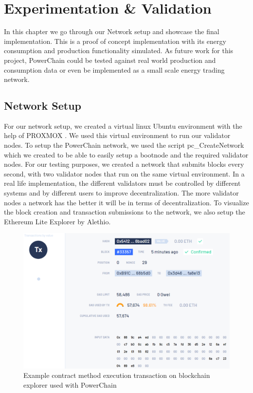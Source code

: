 \chapter{Experimentation \& Validation} \label{experimentationANDresults}
In this chapter we go through our Network setup and showcase the final implementation. This is a proof of concept implementation with its energy consumption and production functionality simulated.
As future work for this project, PowerChain could be tested against real world production and consumption data or even be implemented as a small scale energy trading network.

\section{Network Setup}
For our network setup, we created a virtual linux Ubuntu environment with the help of PROXMOX \cite{proxmox}.
We used this virtual environment to run our validator nodes. To setup the PowerChain network, we used the script pc\_CreateNetwork which we
created to be able to easily setup a bootnode and the required validator nodes. For our testing purposes, we created a network that submits blocks every second, with two validator nodes that
run on the same virtual environment. In a real life implementation, the different validators must be controlled by different systems and by different users to improve
decentralization. The more validator nodes a network has the better it will be in terms of decentralization. To visualize the block creation and transaction submissions 
to the network, we also setup the Ethereum Lite Explorer by Alethio.\cite{alethio} \\
\begin{figure}[h!]
    \centering
    \includegraphics[width=\linewidth,frame,scale=0.9]{Figures/explorer.png}
    \caption{Example contract method execution transaction on blockchain explorer used with PowerChain}
\end{figure}
